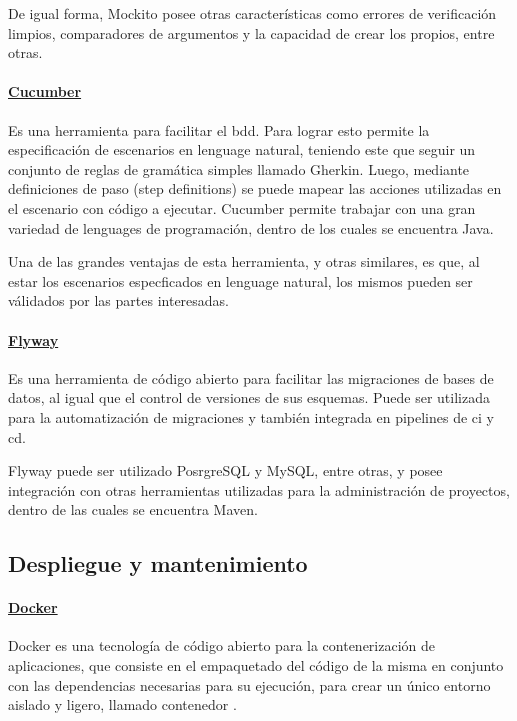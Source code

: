 De igual forma, Mockito posee otras características como errores de verificación limpios, comparadores de argumentos y la capacidad de crear los propios, entre otras. 

\paragraph{\href{https://cucumber.io/docs}{Cucumber}}
Es una herramienta para facilitar el \acrshort{bdd}. Para lograr esto permite la especificación de escenarios en lenguage natural, teniendo este que seguir un conjunto de reglas de gramática simples llamado Gherkin. Luego, mediante definiciones de paso (step definitions) se puede mapear las acciones utilizadas en el escenario con código a ejecutar. Cucumber permite trabajar con una gran variedad de lenguages de programación, dentro de los cuales se encuentra Java.

Una de las grandes ventajas de esta herramienta, y otras similares, es que, al estar los escenarios especficados en lenguage natural, los mismos pueden ser válidados por las partes interesadas.

\paragraph{\href{https://www.red-gate.com/products/flyway/community/}{Flyway}}
Es una herramienta de código abierto para facilitar las migraciones de bases de datos, al igual que el control de versiones de sus esquemas. Puede ser utilizada para la automatización de migraciones y también integrada en pipelines de \acrshort{ci} y \acrshort{cd}.

Flyway puede ser utilizado PosrgreSQL y MySQL, entre otras, y posee integración con otras herramientas utilizadas para la administración de proyectos, dentro de las cuales se encuentra Maven. 

\subsection{Despliegue y mantenimiento}

\paragraph{\href{https://www.docker.com/}{Docker}}
Docker es una tecnología de código abierto para la contenerización de aplicaciones, que consiste en el empaquetado del código de la misma en conjunto con las dependencias necesarias para su ejecución, para crear un único entorno aislado y ligero, llamado contenedor \cite{ibmContainerization}.

